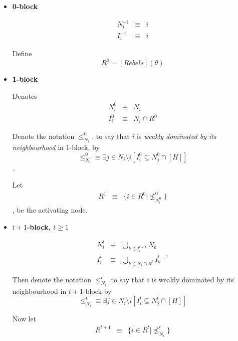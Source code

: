 \documentclass[12pt]{article}
\theoremstyle{remark}
\theoremstyle{remark}
\begin{document}
\begin{itemize}

\item \textbf{0-block}

\begin{eqnarray}
N^{-1}_i &\equiv &  i \\
I^{-1}_i & \equiv & i
\end{eqnarray}

Define
\[R^0=[Rebels](\theta)\]

\item \textbf{1-block}



Denotes
\begin{eqnarray}
N^0_i &\equiv &  N_i \\
I^0_i & \equiv & N_i\cap R^0
\end{eqnarray}



Denote the notation $\leq^0_{N_i}$, to say that $i$ is \emph{weakly dominated by its neighbourhood} in 1-block, by
\begin{equation}\leq^0_{N_i}\equiv \exists  j\in N_i\setminus i [I^0_i\subseteq N^0_j\cap [H]]\end{equation}.  

Let 
\begin{eqnarray*}
R^{1} &\equiv &  \{i\in R^0|\nleq^0_{N^0_i}\}
\end{eqnarray*}
, be the activating node.






\item \textbf{$t+1$-block, $t\geq 1$}

\begin{eqnarray}
N^t_i & \equiv & \bigcup_{k\in I^{t-1}_i}N_k \\
I^t_i & \equiv & \bigcup_{k\in N_i\cap R^t}I^{t-1}_k
\end{eqnarray}


Then denote the notation $\leq^t_{N_i}$ to say that $i$ is weakly dominated by its neighbourhood in $t+1$-block by
\begin{equation}\leq^t_{N_i}\equiv \exists j\in N_i\setminus i[I^t_i\subseteq N^t_j\cap [H]]\end{equation}



Now let
\begin{eqnarray*}
R^{t+1} &\equiv &  \{i\in R^t|\nleq^t_{N_i}\}
\end{eqnarray*}


\end{itemize}
\end{document}
